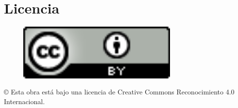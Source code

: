 \documentclass[a4paper,openright,14pt]{report}
\begin{document}
\chapter*{Licencia}

\vspace*{0.4in}
\begin{center}
	\begin{figure}[htb]
		\begin{center}
			\includegraphics[width=8cm]{./images/logotipo-licencia.png}
		\end{center}
	\end{figure}

	\begin{Large}
		© Esta obra está bajo una licencia de Creative Commons Reconocimiento 4.0 Internacional.
	\end{Large}
\end{center}
\end{document}
